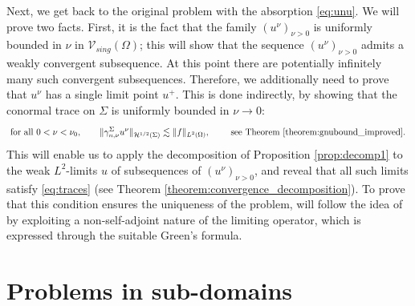 \documentclass[report]{elsarticle}
\numberwithin{theorem}{section}
\begin{document}
Next, we get back to the original problem with the absorption \eqref{eq:unu}. We will prove two facts. 
First, it is the fact that  the family $(u^{\nu})_{\nu>0}$ is uniformly bounded in $\nu$ in  $\mathcal{V}_{sing}(\Omega)$; this will show that the sequence $(u^{\nu})_{\nu>0}$ admits a weakly convergent subsequence. At this point there are potentially infinitely many such convergent subsequences. Therefore, we additionally need to prove that $u^{\nu}$ has a single limit point $u^+$. This is done indirectly, by showing that the conormal trace on $\Sigma$ is uniformly bounded in $\nu\rightarrow 0$:
\begin{align*}
	\text{ for all }0<\nu<\nu_0, \qquad  	\|\gamma_{n,\nu}^{\Sigma}u^{\nu}\|_{\mathcal{H}^{1/2}(\Sigma)}\lesssim \|f\|_{L^2(\Omega)},\qquad  \text{ see Theorem \ref{theorem:gnubound_improved}. }
\end{align*}
This will enable us to apply the decomposition of Proposition \ref{prop:decomp1} to the weak $L^2$-limits $u$ of subsequences of $(u^{\nu})_{\nu>0}$, and reveal that all such  limits satisfy \eqref{eq:traces} (see Theorem \ref{theorem:convergence_decomposition}). To prove that this condition ensures the uniqueness of the problem, will follow the idea of \cite{ciarlet_mk_peillon} by exploiting a non-self-adjoint nature of the limiting operator, which is expressed through the suitable Green's formula. 




\section{Problems in sub-domains}
\label{sec:subdomains}



%
%
\end{document}
